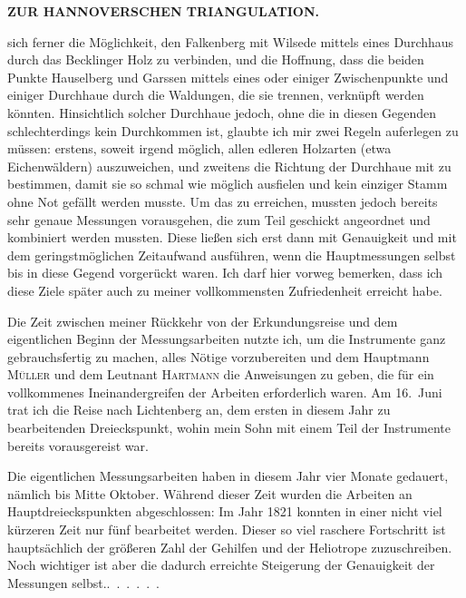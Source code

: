 \par\clearpage
\noindent\null\hfill{\small\textbf{ZUR HANNOVERSCHEN TRIANGULATION.}}\hfill{}\par\medskip
\noindent sich ferner die Möglichkeit, den Falkenberg mit Wilsede mittels eines
Durchhaus durch das Becklinger Holz zu verbinden, und die Hoffnung, dass
die beiden Punkte Hauselberg und Garssen mittels eines oder einiger
Zwischenpunkte und einiger Durchhaue durch die Waldungen, die sie trennen,
verknüpft werden könnten. Hinsichtlich solcher Durchhaue jedoch, ohne die
in diesen Gegenden schlechterdings kein Durchkommen ist, glaubte ich mir
zwei Regeln auferlegen zu müssen: erstens, soweit irgend möglich, allen
edleren Holzarten (etwa Eichenwäldern) auszuweichen, und zweitens die Richtung
der Durchhaue  mit  zu
bestimmen, damit sie so schmal wie möglich ausfielen und kein einziger Stamm
ohne Not gefällt werden musste. Um das zu erreichen, mussten jedoch bereits
sehr genaue Messungen vorausgehen, die zum Teil geschickt angeordnet und
kombiniert werden mussten. Diese ließen sich erst dann mit Genauigkeit und
mit dem geringstmöglichen Zeitaufwand ausführen, wenn die Hauptmessungen
selbst bis in diese Gegend vorgerückt waren. Ich darf hier vorweg bemerken,
dass ich diese Ziele später auch zu meiner vollkommensten Zufriedenheit
erreicht habe.

Die Zeit zwischen meiner Rückkehr von der Erkundungsreise und dem eigentlichen
Beginn der Messungsarbeiten nutzte ich, um die Instrumente ganz gebrauchsfertig
zu machen, alles Nötige vorzubereiten und dem Hauptmann \textsc{Müller} und
dem Leutnant \textsc{Hartmann} die Anweisungen zu geben, die für ein vollkommenes
Ineinandergreifen der Arbeiten erforderlich waren. Am 16.~Juni trat ich die
Reise nach Lichtenberg an, dem ersten in diesem Jahr zu bearbeitenden
Dreieckspunkt, wohin mein Sohn mit einem Teil der Instrumente bereits
vorausgereist war.

Die eigentlichen Messungsarbeiten haben in diesem Jahr vier Monate gedauert,
nämlich bis Mitte Oktober. Während dieser Zeit wurden die Arbeiten an
 Hauptdreieckspunkten abgeschlossen: Im Jahr 1821 konnten in einer
nicht viel kürzeren Zeit nur fünf bearbeitet werden. Dieser so viel raschere
Fortschritt ist hauptsächlich der größeren Zahl der Gehilfen und der
Heliotrope zuzuschreiben. Noch wichtiger ist aber die dadurch erreichte
Steigerung der Genauigkeit der Messungen selbst.\quad\mbox{.\ .\ .\ .\ .\ .}

